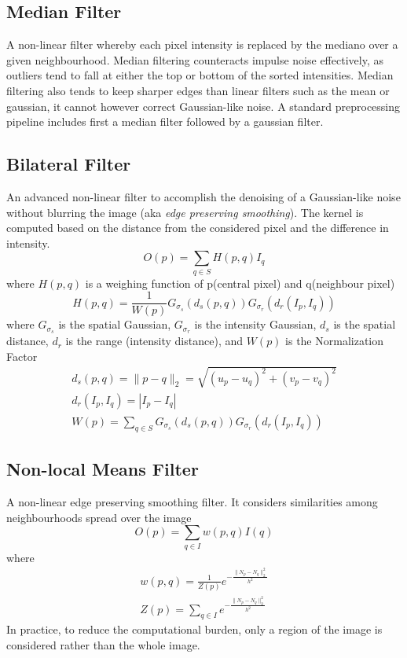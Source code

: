 \documentclass{article}
\begin{document}
\subsection{Median Filter}
A non-linear filter whereby each pixel intensity is replaced by the mediano over a given neighbourhood. Median filtering counteracts impulse noise effectively, as outliers tend to fall at either the top or bottom of the sorted intensities. Median filtering also tends to keep sharper edges than linear filters such as the mean or gaussian, it cannot however correct Gaussian-like noise. A standard preprocessing pipeline includes first a median filter followed by a gaussian filter.
\subsection{Bilateral Filter}
An advanced non-linear filter to accomplish the denoising of a Gaussian-like noise without blurring the image (aka \emph{edge preserving smoothing}). The kernel is computed based on the distance from the considered pixel and the difference in intensity.
\[
    O(p)=\sum_{q\in S} H(p,q)I_q
\]
where $H(p,q)$ is a weighing function of p(central pixel) and q(neighbour pixel)
\[
    H(p,q) = \frac{1}{W(p)}G_{\sigma_s}(d_s(p,q))G_{\sigma_r}(d_r(I_p,I_q))
\]
where $G_{\sigma_s}$ is the spatial Gaussian, $G_{\sigma_r}$ is the intensity Gaussian, $d_s$ is the spatial distance, $d_r$ is the range (intensity distance), and $W(p)$ is the Normalization Factor
\begin{gather*}
    d_s(p,q) = \|p-q\|_2 = \sqrt{(u_p-u_q)^2+(v_p-v_q)^2}\\
    d_r(I_p,I_q) = |I_p-I_q|\\
    W(p)= \sum_{q\in S} G_{\sigma_s}(d_s(p,q))G_{\sigma_r}(d_r(I_p,I_q))
\end{gather*}
\subsection{Non-local Means Filter}
A non-linear edge preserving smoothing filter. It considers similarities among neighbourhoods spread over the image
\[
    O(p) = \sum_{q\in I}w(p,q)I(q)
\]
where
\begin{gather*}
    w(p,q)=\frac{1}{Z(p)}e^{-\frac{\|N_p-N_q\|^2_2}{h^2}}\\
    Z(p) = \sum_{q\in I} e^{-\frac{\|N_p-N_q\|^2_2}{h^2}}
\end{gather*}
In practice, to reduce the computational burden, only a region of the image is considered rather than the whole image.
\end{document}
